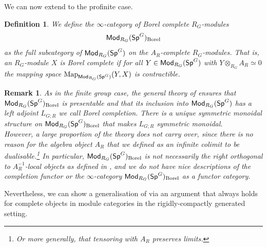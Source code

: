 \documentclass[reqno]{amsart}
\numberwithin{equation}{section}\theoremstyle{thms}
\theoremstyle{defn}
\newtheorem{defi}[equation]{Definition}
\newtheorem{rem}[equation]{Remark}
\newcommand{\tn}[1]{\textnormal{#1}}
\newcommand{\tsf}[1]{\textsf{\textup{#1}}}
\newcommand{\Map}{\tn{Map}}
\newcommand{\Mod}{\tsf{Mod}}
\newcommand{\specg}{\tsf{Sp}^G}
\begin{document}
We can now extend  to the profinite case.

\begin{defi}
We define the $\infty$-category of \emph{Borel complete $R_G$-modules} 
$$\Mod_{R_G}(\specg)_{\tn{Borel}}$$
as the full subcategory of $\Mod_{R_G}(\specg)$ on the $A_R$-complete $R_G$-modules. That is, an $R_G$-module $X$ is Borel complete if for all $Y \in \Mod_{R_G}(\specg)$ with $Y \otimes_{R_G} A_R \simeq 0$ the mapping space $\Map_{\Mod_{R_G}(\specg)}(Y,X)$ is contractible.
\end{defi}

\begin{rem}
As in the finite group case, the general theory of \cite[§2.2]{mnn17} ensures that $\Mod_{R_G}(\specg)_{\tn{Borel}}$ is presentable and that its inclusion into $\Mod_{R_G}(\specg)$ has a left adjoint $L_{G;R}$ we call \emph{Borel completion}. There is a unique symmetric monoidal structure on $\Mod_{R_G}(\specg)_{\tn{Borel}}$ that makes $L_{G;R}$ symmetric monoidal. \\
However, a large proportion of the theory does not carry over, since there is no reason for the algebra object $A_R$ that we defined as an infinite colimit to be dualisable.\footnote{Or more generally, that tensoring with $A_R$ preserves limits.} In particular, $\Mod_{R_G}(\specg)_{\tn{Borel}}$ is not necessarily the right orthogonal to $A_R^{-1}$-local objects as defined in \cite[Definition 3.10]{mnn17}, and we do not have nice descriptions of the completion functor or the $\infty$-category $\Mod_{R_G}(\specg)_{\tn{Borel}}$ as a functor category.
\end{rem}

Nevertheless, we can show a generalisation of  via an argument that always holds for complete objects in module categories in the rigidly-compactly generated setting.
\end{document}
